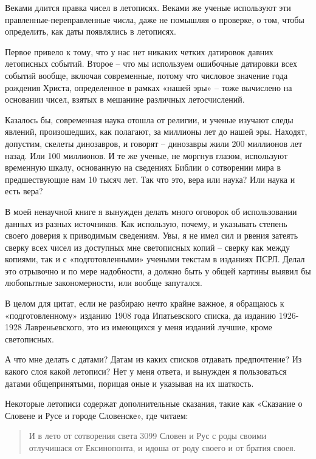 Веками длится правка чисел в летописях. Веками же ученые используют эти правленные-переправленные числа, даже не помышляя о проверке, о том, чтобы определить, как даты появлялись в летописях.

Первое привело к тому, что у нас нет никаких четких датировок давних летописных событий. Второе – что мы используем ошибочные датировки всех событий вообще, включая современные, потому что числовое значение года рождения Христа, определенное в рамках «нашей эры» – тоже вычислено на основании чисел, взятых в мешанине различных летосчислений.

Казалось бы, современная наука отошла от религии, и ученые изучают следы явлений, произошедших, как полагают, за миллионы лет до нашей эры. Находят, допустим, скелеты динозавров, и говорят – динозавры жили 200 миллионов лет назад. Или 100 миллионов. И те же ученые, не моргнув глазом, используют временную шкалу, основанную на сведениях Библии о сотворении мира в предшествующие нам 10 тысяч лет. Так что это, вера или наука? Или наука и есть вера?

В моей ненаучной книге я вынужден делать много оговорок об использовании данных из разных источников. Как использую, почему, и указывать степень своего доверия к приводимым сведениям. Увы, я не имел сил и рвения затеять сверку всех чисел из доступных мне светописных копий – сверку как между копиями, так и с «подготовленными» учеными текстам в изданиях ПСРЛ. Делал это отрывочно и по мере надобности, а должно быть у общей картины выявил бы любопытные закономерности, или вообще запутался.

В целом для цитат, если не разбираю нечто крайне важное, я обращаюсь к «подготовленному» изданию 1908 года Ипатьевского списка, да изданию 1926-1928 Лавреньевского, это из имеющихся у меня изданий лучшие, кроме светописных.

А что мне делать с датами? Датам из каких списков отдавать предпочтение? Из какого слоя какой летописи? Нет у меня ответа, и вынужден я пользоваться датами общепринятыми, порицая оные и указывая на их шаткость.

Некоторые летописи содержат дополнительные сказания, такие как «Сказание о Словене и Русе и городе Словенске», где читаем:

\begin{quotation}
И в лето от сотворения света 3099 Словен и Рус с роды своими отлучишася от Ексинопонта, и идоша от роду своего и от братия своея.
\end{quotation}

